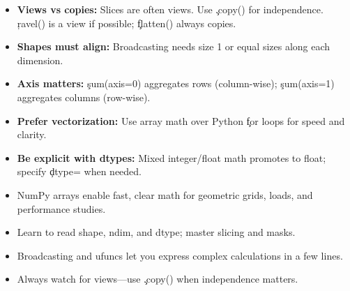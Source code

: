 \begin{itemize}
\item \textbf{Views vs copies:} Slices are often views. Use \c{.copy()} for independence. \c{ravel()} is a view if possible; \c{flatten()} always copies.
\item \textbf{Shapes must align:} Broadcasting needs size 1 or equal sizes along each dimension.
\item \textbf{Axis matters:} \c{sum(axis=0)} aggregates rows (column-wise); \c{sum(axis=1)} aggregates columns (row-wise).
\item \textbf{Prefer vectorization:} Use array math over Python \c{for} loops for speed and clarity.
\item \textbf{Be explicit with dtypes:} Mixed integer/float math promotes to float; specify \c{dtype=} when needed.
\end{itemize}

\begin{tcolorbox}[%
    colframe=orange,
    colback = white,
    arc=2mm %
 ]
\begin{itemize}
\item NumPy arrays enable fast, clear math for geometric grids, loads, and performance studies.
\item Learn to read shape, ndim, and dtype; master slicing and masks.
\item Broadcasting and ufuncs let you express complex calculations in a few lines.
\item Always watch for views—use \c{.copy()} when independence matters.
\end{itemize}
\end{tcolorbox}